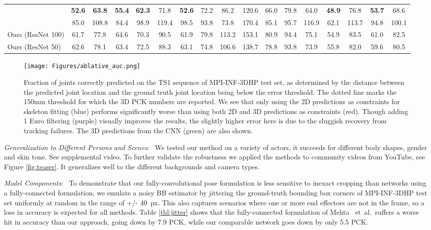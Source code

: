 \documentclass[acmtog]{acmart}
\newcommand{\parahead}[1]{\vspace{5pt}\noindent\emph{#1}:\ }
\newcommand{\etal}{~et~al.\ }
\begin{document}
\begin{table*}[]
\begin{tabular}{l||c|c|c|c|c|c|c|c|c|c|c|c|c|c|c||c}
\cite{mehta_mlc3d_arxiv16}          & \textbf{52.6}   & \textbf{63.8}    & \textbf{55.4}   & \textbf{62.3}  & 71.8  & \textbf{52.6}   & 72.2   & 86.2    & 120.6 & 66.0  & 79.8  & 64.0  & \textbf{48.9}  & 76.8  & \textbf{53.7}  & 68.6                 \\
\cite{tekin_fusion_arxiv16}        & 85.0   & 108.8   & 84.4   & 98.9  & 119.4 & 98.5   & 93.8   & 73.8    & 170.4 & 85.1  & 95.7  & 116.9 & 62.1  & 113.7 & 94.8  & 100.1                \\ \hline \hline
Ours (ResNet 100)   & 61.7   & 77.8    & 64.6   & 70.3  & 90.5  & 61.9   & 79.8   & 113.2   & 153.1 & 80.9  & 94.4  & 75.1  & 54.9  & 83.5  & 61.0  & 82.5                 \\
Ours (ResNet 50)   & 62.6   & 78.1    & 63.4   & 72.5  & 88.3  & 63.1   & 74.8   & 106.6   & 138.7 & 78.8  & 93.8  & 73.9  & 55.8  & 82.0  & 59.6  & 80.5                
\end{tabular}
\end{table*}


\begin{figure}[]
   \centering\texttt{[image: Figures/ablative\_auc.png]}
	\caption{Fraction of joints correctly predicted on the TS1 sequence of MPI-INF-3DHP test set, as determined by the distance between the predicted joint location and the ground truth joint location being below the error threshold. The dotted line marks the 150mm threshold for which the 3D PCK numbers are reported. We see that only using the 2D predictions as constraints for skeleton fitting (blue) performs significantly worse than using both 2D and 3D predictions as constraints (red). Though adding 1 Euro filtering (purple) visually improves the results, the slightly higher error here is due to the sluggish recovery from tracking failures. The 3D predictions from the CNN (green) are also shown.}
    \vspace{-0.4cm}
	\label{fig:ablative_auc}
\end{figure}



\parahead{Generalization to Different Persons and Scenes}
\label{sec:generalization}
We tested our method on a variety of actors, it succeeds for different body shapes, gender and skin tone. See supplemental video. To further validate the robustness we applied the methods to community videos from YouTube, see Figure \ref{fig:teaser}. It generalizes well to the different backgrounds and camera types.

\parahead{Model Components}
\label{sec:ablation}
To demonstrate that our fully-convolutional pose formulation is less sensitive to inexact cropping than networks using a fully-connected formulation, we emulate a noisy BB estimator by jittering the ground-truth bounding box corners of MPI-INF-3DHP test set uniformly at random in the range of +/- 40~px. This also captures scenarios where one or more end effectors are not in the frame, so a loss in accuracy is expected for all methods. Table \ref{tbl:jitter} shows that the fully-connected formulation of Mehta \etal suffers a worse hit in accuracy than our approach, going down by 7.9 PCK, while our comparable network goes down by only 5.5 PCK.
\end{document}
